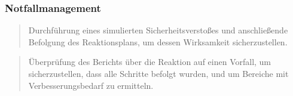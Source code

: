 \documentclass{article}
\begin{document}
\subsubsection*{Notfallmanagement}

\begin{quote}
Durchführung eines simulierten Sicherheitsverstoßes und anschließende Befolgung des 
Reaktionsplans, um dessen Wirksamkeit sicherzustellen.
\end{quote}

\begin{quote}
Überprüfung des Berichts über die Reaktion auf einen Vorfall, um sicherzustellen, dass 
alle Schritte befolgt wurden, und um Bereiche mit Verbesserungsbedarf zu ermitteln.
\end{quote}
\end{document}
